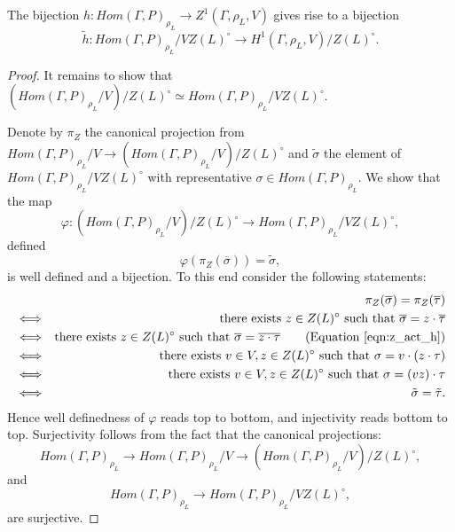\begin{lemma}
  The bijection $h: Hom(\Gamma, P)_{\rho_L} \rightarrow Z^1(\Gamma, \rho_L, V)$ gives rise to a bijection
  \begin{displaymath}
    \tilde{h}: Hom(\Gamma, P)_{\rho_L}/VZ(L)^\circ \rightarrow H^1(\Gamma, \rho_L, V)/Z(L)^\circ.
  \end{displaymath}
  \label{lem:vzl_h1zl}
\end{lemma}
\begin{proof}
  It remains to show that $\left(Hom(\Gamma, P)_{\rho_L}/V\right)/Z(L)^\circ \simeq Hom(\Gamma, P)_{\rho_L}/VZ(L)^\circ$.

  Denote by $\pi_Z$ the canonical projection from $Hom(\Gamma, P)_{\rho_L}/V \rightarrow \left( Hom(\Gamma, P)_{\rho_L}/V \right)/Z(L)^\circ$ and $\tilde{\sigma}$ the element of $Hom(\Gamma, P)_{\rho_L}/VZ(L)^\circ$ with representative $\sigma \in Hom(\Gamma, P)_{\rho_L}$. We show that the map
  \begin{displaymath}
    \varphi: (Hom(\Gamma, P)_{\rho_L}/V)/Z(L)^\circ \rightarrow Hom(\Gamma, P)_{\rho_L}/VZ(L)^\circ,
  \end{displaymath}
  defined
  \begin{displaymath}
    \varphi(\pi_Z(\overline{\sigma})) = \tilde{\sigma},
  \end{displaymath}
  is well defined and a bijection. To this end consider the following statements:
  \begin{eqnarray*}
    && \pi_Z(\overline{\sigma}) = \pi_Z(\overline{\tau}) \\
    &\Longleftrightarrow& \textrm{there exists } z \in Z(L)^\circ \textrm{ such that } \overline{\sigma} = z \cdot \overline{\tau} \\
    &\Longleftrightarrow& \textrm{there exists } z \in Z(L)^\circ \textrm{ such that } \overline{\sigma} = \overline{z \cdot \tau} \qquad (\textrm{Equation } \ref{eqn:z_act_h}) \\
    &\Longleftrightarrow& \textrm{there exists } v \in V, z \in Z(L)^\circ \textrm{ such that } \sigma = v \cdot (z \cdot \tau) \\
    &\Longleftrightarrow& \textrm{there exists } v \in V, z \in Z(L)^\circ \textrm{ such that } \sigma = (vz) \cdot \tau \\
    &\Longleftrightarrow& \tilde{\sigma} = \tilde{\tau}.
  \end{eqnarray*}
  Hence well definedness of $\varphi$ reads top to bottom, and injectivity reads bottom to top. Surjectivity follows from the fact that the canonical projections:
  \begin{displaymath}
    Hom(\Gamma, P)_{\rho_L} \rightarrow Hom(\Gamma, P)_{\rho_L}/V \rightarrow (Hom(\Gamma, P)_{\rho_L}/V)/Z(L)^\circ, 
  \end{displaymath}
  and
  \begin{displaymath}
    Hom(\Gamma, P)_{\rho_L} \rightarrow Hom(\Gamma, P)_{\rho_L}/VZ(L)^\circ, 
  \end{displaymath}
  are surjective.
\end{proof}

